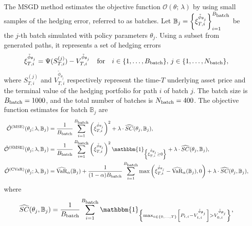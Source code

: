 \documentclass[12pt]{article}
\begin{document}
The MSGD method estimates the objective function $\mathcal{O}(\theta;\, \lambda)$ by using small samples of the hedging error, referred to as batches. 
Let $\mathbb{B}_{j}
    =\left\{ \xi_{T,i}^{\tilde{\phi}_{\theta_{j}}} \right\}_{i=1}^{B_{\mbox{\scriptsize{batch}}}}$ 
be the $j$-th batch simulated with policy parameters $\theta_{j}$. Using a subset from generated paths, it represents a set of hedging errors
\[
    \xi_{T,i}^{\tilde{\phi}_{\theta_{j}}} 
    = \Psi(S^{(j)}_{T,i}) - V_{T,i}^{\tilde{\phi}_{\theta_{j}}} \quad \mbox{for} \quad i \in \{1, \dots, B_{\mbox{\scriptsize{batch}}}\}, \, j \in \{1, \dots, N_{\mbox{\scriptsize{batch}}} \},
\]
where $S^{(j)}_{T,i}$ and $V_{T,i}^{\tilde{\phi}_{\theta_{j}}}$ respectively represent the time-$T$ underlying asset price and the terminal value of the hedging portfolio for path $i$ of batch $j$. The batch size is $B_{\mbox{\scriptsize{batch}}}=1000$, and the total number of batches is $N_{\mbox{\scriptsize{batch}}}=400$.
The objective function estimates for batch $\mathbb{B}_j$ are
\begin{align*}
    \Hat{\mathcal{O}}^{\left(\mbox{\scriptsize{MSE}}\right)}(\theta_{j}; \lambda,\mathbb{B}_{j}) 
    &= \frac{1}{B_{\mbox{\scriptsize{batch}}}}\sum_{i=1}^{B_{\mbox{\scriptsize{batch}}}} \left(\xi_{T,i}^{\tilde{\phi}_{\theta_{j}}}\right)^2 + \lambda \cdot \widehat{SC}(\theta_{j}, \mathbb{B}_{j}), \\
    \Hat{\mathcal{O}}^{\left(\mbox{\scriptsize{SMSE}}\right)}(\theta_{j}; \lambda,\mathbb{B}_{j}) 
    &= \frac{1}{B_{\mbox{\scriptsize{batch}}}}\sum_{i=1}^{B_{\mbox{\scriptsize{batch}}}} \left(\xi_{T,i}^{\tilde{\phi}_{\theta_{j}}}\right)^2 \mathbbm{1}_{\left\{\xi_{T,i}^{\tilde{\phi}_{\theta_{j}}} \geq 0 \right\}} + \lambda \cdot \widehat{SC}(\theta_{j}, \mathbb{B}_{j}), \\
    \Hat{\mathcal{O}}^{\left(\mbox{\scriptsize{CVaR}}\right)}(\theta_{j};\lambda,\mathbb{B}_{j}) &= \widehat{\mbox{VaR}}_{\alpha}(\mathbb{B}_{j}) + \frac{1}{(1 - \alpha) B_{\mbox{\scriptsize{batch}}}} \sum_{i=1}^{B_{\mbox{\scriptsize{batch}}}} \max\left( \xi_{T,i}^{\tilde{\phi}_{\theta_{j}}} - \widehat{\mbox{VaR}}_{\alpha}(\mathbb{B}_{j}), 0 \right) %
    + \lambda \cdot \widehat{SC}(\theta_{j}, \mathbb{B}_{j}),
\end{align*}
where
\[
    \widehat{SC}(\theta_{j}, \mathbb{B}_{j}) = \frac{1}{B_{\mbox{\scriptsize{batch}}}} \sum_{i=1}^{B_{\mbox{\scriptsize{batch}}}} \mathbbm{1}_{ \left\{ \max_{t \in \{0, \dots, T\}} \left[P_{t,i} - V_{t,i}^{\tilde{\phi}_{\theta_{j}}} \right] > V_{0,i}^{\tilde{\phi}_{\theta_{j}}} \right\}},
\]
\end{document}
